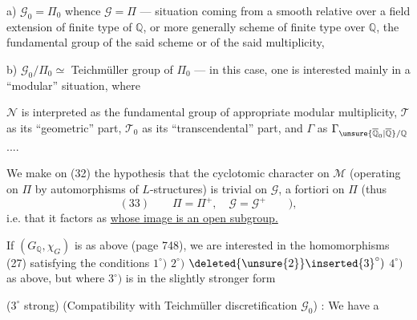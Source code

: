 a) $\mathcal{G}_0=\Pi_0$ whence $\mathcal{G}=\Pi$ --- situation coming from a smooth relative  over a field  extension of finite type of $\mathbb{Q}$, or more generally  scheme   of finite type over $\mathbb{Q}$,   the fundamental group of the said  scheme or of the said multiplicity,

b) $\mathcal{G}_0/\Pi_0\simeq$ Teichmüller group of $\Pi_0$  --- in this case, one is interested mainly in a ``modular'' situation, where


$\mathcal{N}$ is interpreted as the fundamental group of  appropriate modular multiplicity, $\mathcal{T}$ as its ``geometric'' part, $\mathcal{T}_0$ as its ``transcendental'' part, and $\Gamma$ as $\Gamma_{\unsure{\overline{\mathbb{Q}}_0|\overline{\mathbb{Q}}}/\mathbb{Q}}$ ....

We make on (32) the hypothesis that the cyclotomic character on $\mathcal{M}$ (operating on $\Pi$ by automorphisms of $L$-structures) is trivial on $\mathcal{G}$, a fortiori on $\Pi$ (thus
\[
(33)\qquad \Pi=\Pi^{+},\quad \mathcal{G}=\mathcal{G}^{+}\qquad ),
\]
i.e. that it factors as
\uline{whose image is an open subgroup.}

If $(G_{\mathbb{Q}},\chi_G)$ is as above (page 748), we are interested in the homomorphisms (27)
satisfying the conditions $1^{\circ})$ $2^{\circ})$ $\deleted{\unsure{2}}\inserted{3}^{\circ})$ $4^{\circ})$ as above, but where $3^{\circ})$ is  in the slightly stronger form

($3^{\circ}$ strong) (Compatibility with Teichmüller discretification $\mathcal{G}_0$) : We have a 


